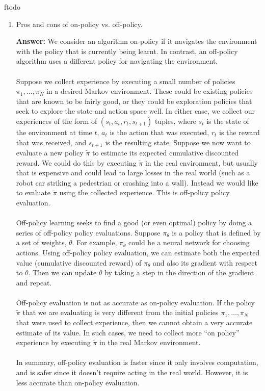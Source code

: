 ƒtodo\documentclass{article}
\newenvironment{QandA}{\begin{enumerate}[label=\arabic*.]}{\end{enumerate}}
\newenvironment{answer}{\par\normalfont \textbf{Answer:}}{}
\begin{document}
\begin{QandA}
    \item Pros and cons of on-policy vs. off-policy.
    \begin{answer}
        We consider an algorithm on-policy if it navigates the environment with the policy that is currently being learnt. In contrast, an off-policy algorithm uses a different policy for navigating the environment. \\\\
        Suppose we collect experience by executing a small number of policies $\pi_1, \ldots, \pi_N$ in a desired Markov environment. These could be existing policies that are known to be fairly good, or they could be exploration policies that seek to explore the state and action space well. In either case, we collect our experiences of the form of $(s_t, a_t, r_t, s_{t+1})$ tuples, where $s_t$ is the state of the environment at time $t$, $a_t$ is the action that was executed, $r_t$ is the reward that was received, and $s_{t+1}$ is the resulting state. Suppose we now want to evaluate a new policy $\tilde{\pi}$ to estimate its expected cumulative discounted reward. We could do this by executing $\tilde{\pi}$ in the real environment, but usually that is expensive and could lead to large losses in the real world (such as a robot car striking a pedestrian or crashing into a wall). Instead we would like to evaluate $\tilde{\pi}$ using the collected experience. This is off-policy policy evaluation.\\\\
        Off-policy learning seeks to find a good (or even optimal) policy by doing a series of off-policy policy evaluations. Suppose $\pi_\theta$ is a policy that is defined by a set of weights, $\theta$. For example, $\pi_\theta$ could be a neural network for choosing actions. Using off-policy policy evaluation, we can estimate both the expected value (cumulative discounted reward) of $\pi_\theta$ and also its gradient with respect to $\theta$. Then we can update $\theta$ by taking a step in the direction of the gradient and repeat. \\\\
        Off-policy evaluation is not as accurate as on-policy evaluation. If the policy $\tilde{\pi}$ that we are evaluating is very different from the initial policies $\pi_1, \ldots, \pi_N$ that were used to collect experience, then we cannot obtain a very accurate estimate of its value. In such cases, we need to collect more “on policy” experience by executing $\tilde{\pi}$ in the real Markov environment.\\\\
        In summary, off-policy evaluation is faster since it only involves computation, and is safer since it doesn't require acting in the real world. However, it is less accurate than on-policy evaluation.


\end{answer}
\end{QandA}
\end{document}
